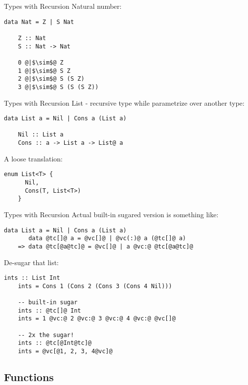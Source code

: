 \documentclass[xcolor={usenames,dvipsnames}]{beamer}
\begin{document}
\begin{frame}[fragile]{Types with Recursion}
  Natural number:
  \begin{lstlisting}[style=hask]
    data Nat = Z | S Nat

    Z :: Nat
    S :: Nat -> Nat

    0 @|$\sim$@ Z
    1 @|$\sim$@ S Z
    2 @|$\sim$@ S (S Z)
    3 @|$\sim$@ S (S (S Z))
  \end{lstlisting}
\end{frame}

\begin{frame}[fragile]{Types with Recursion}
  List - recursive type while parametrize over another type:
  \begin{lstlisting}[style=hask]
    data List a = Nil | Cons a (List a)

    Nil :: List a
    Cons :: a -> List a -> List@ a
  \end{lstlisting}

  \pause
  A loose translation:
  \begin{lstlisting}[style=hask]
    enum List<T> {
      Nil,
      Cons(T, List<T>)
    }
  \end{lstlisting}
\end{frame}

\begin{frame}[fragile]{Types with Recursion}
  Actual built-in sugared version is something like:
  \begin{lstlisting}[style=hask]
       data List a = Nil | Cons a (List a)
       data @tc[]@ a = @vc[]@ | @vc(:)@ a (@tc[]@ a)
    => data @tc[@a@tc]@ = @vc[]@ | a @vc:@ @tc[@a@tc]@
  \end{lstlisting}

  \pause
  De-sugar that list:
  \begin{lstlisting}[style=hask]
    ints :: List Int 
    ints = Cons 1 (Cons 2 (Cons 3 (Cons 4 Nil)))

    -- built-in sugar
    ints :: @tc[]@ Int
    ints = 1 @vc:@ 2 @vc:@ 3 @vc:@ 4 @vc:@ @vc[]@

    -- 2x the sugar!
    ints :: @tc[@Int@tc]@
    ints = @vc[@1, 2, 3, 4@vc]@
  \end{lstlisting}
\end{frame}


\subsection{Functions}
\end{document}
